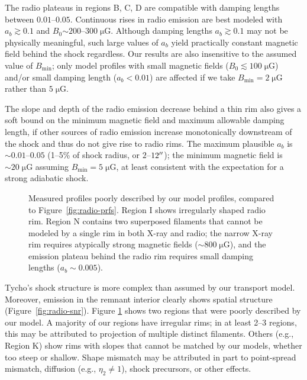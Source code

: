 \documentclass[iop, apj, numberedappendix]{emulateapj}
\newcommand*{\mt}{\mathrm}
\newcommand*{\unit}[1]{\;\mt{#1}}  %
\newcommand*{\abt}{\mathord{\sim}} %
\newcommand*{\Bmin}{B_{\mt{min}}}
\newcommand*{\muG}{\unit{\mu G}}
\begin{document}

The radio plateaus in regions B, C, D are compatible with damping lengths
between $0.01$--$0.05$.  Continuous rises in radio emission are best modeled
with $a_b \gtrsim 0.1$ and $B_0 \abt 200$--$300 \muG$.  Although damping
lengths $a_b \gtrsim 0.1$ may not be physically meaningful, such large values
of $a_b$ yield practically constant magnetic field behind the shock regardless.
Our results are also insensitive to the assumed value of $\Bmin$; only model
profiles with small magnetic fields ($B_0 \lesssim 100 \muG$) and/or small
damping length ($a_b < 0.01$) are affected if we take $\Bmin = 2 \muG$ rather
than $5 \muG$.

The slope and depth of the radio emission decrease behind a thin rim also
gives a soft bound on the minimum magnetic field and maximum allowable damping
length, if other sources of radio emission increase monotonically downstream of
the shock and thus do not give rise to radio rims.  The maximum plausible $a_b$
is $\abt 0.01$--$0.05$ (1--5\% of shock radius, or $2$--$12\mbox{$^{\prime\prime}$}$); the
minimum magnetic field is $\abt 20 \muG$ assuming $\Bmin = 5 \muG$, at least
consistent with the expectation for a strong adiabatic shock.

\begin{figure}
    \centering
    \iftoggle{manuscript}{
        \epsscale{0.8}
        \plotone{figures/radio-fits-I.pdf} \\
        \plotone{figures/radio-fits-N.pdf}
        \epsscale{1}
    }{
        \texttt{[image: figures/radio-fits-I.pdf]} \\
        \texttt{[image: figures/radio-fits-N.pdf]}
    }
    \caption{Measured profiles poorly described by our model profiles, compared
    to Figure~\ref{fig:radio-prfs}.  Region I shows irregularly shaped radio
    rim.  Region N contains two superposed filaments that cannot be modeled by
    a single rim in both X-ray and radio; the narrow X-ray rim requires
    atypically strong magnetic fields ($\sim 800 \muG$), and the emission
    plateau behind the radio rim requires small damping lengths ($a_b \sim
    0.005$).
    \label{fig:radio-prfs-meh}}
\end{figure}

Tycho's shock structure is more complex than assumed by our transport model.
Moreover, emission in the remnant interior clearly shows spatial structure
(Figure~\ref{fig:radio-snr}).  Figure \ref{fig:radio-prfs-meh} shows two
regions that were poorly described by our model.  A majority of our regions
have irregular rims; in at least 2--3 regions, this may be attributed to
projection of multiple distinct filaments.  Others (e.g., Region K) show rims
with slopes that cannot be matched by our models, whether too steep or
shallow.  Shape mismatch may be attributed in part to point-spread mismatch,
diffusion (e.g., $\eta_2 \neq 1$), shock precursors, or other effects.
\end{document}
